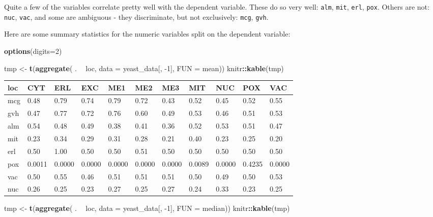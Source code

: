 \documentclass[]{book}
\newenvironment{Shaded}{\begin{snugshade}}{\end{snugshade}}
\newcommand{\DataTypeTok}[1]{\textcolor[rgb]{0.13,0.29,0.53}{#1}}
\newcommand{\DecValTok}[1]{\textcolor[rgb]{0.00,0.00,0.81}{#1}}
\newcommand{\KeywordTok}[1]{\textcolor[rgb]{0.13,0.29,0.53}{\textbf{#1}}}
\newcommand{\NormalTok}[1]{#1}
\newcommand{\OperatorTok}[1]{\textcolor[rgb]{0.81,0.36,0.00}{\textbf{#1}}}
\newcommand{\StringTok}[1]{\textcolor[rgb]{0.31,0.60,0.02}{#1}}
\begin{document}
Quite a few of the variables correlate pretty well with the dependent variable. These do so very well: \texttt{alm}, \texttt{mit}, \texttt{erl}, \texttt{pox}. Others are not: \texttt{nuc}, \texttt{vac}, and some are ambiguous - they discriminate, but not exclusively: \texttt{mcg}, \texttt{gvh}.

Here are some summary statistics for the numeric variables split on the dependent variable:

\begin{Shaded}
\begin{Highlighting}[]
\KeywordTok{options}\NormalTok{(}\DataTypeTok{digits=}\DecValTok{2}\NormalTok{)}

\NormalTok{tmp <-}\StringTok{ }\KeywordTok{t}\NormalTok{(}\KeywordTok{aggregate}\NormalTok{( . }\OperatorTok{~}\StringTok{ }\NormalTok{loc, }\DataTypeTok{data =}\NormalTok{ yeast_data[, }\DecValTok{-1}\NormalTok{], }\DataTypeTok{FUN =}\NormalTok{ mean))}
\NormalTok{knitr}\OperatorTok{::}\KeywordTok{kable}\NormalTok{(tmp)}
\end{Highlighting}
\end{Shaded}

\begin{tabular}{l|l|l|l|l|l|l|l|l|l|l}
\hline
loc & CYT & ERL & EXC & ME1 & ME2 & ME3 & MIT & NUC & POX & VAC\\
\hline
mcg & 0.48 & 0.79 & 0.74 & 0.79 & 0.72 & 0.43 & 0.52 & 0.45 & 0.52 & 0.55\\
\hline
gvh & 0.47 & 0.77 & 0.72 & 0.76 & 0.60 & 0.49 & 0.53 & 0.46 & 0.51 & 0.53\\
\hline
alm & 0.54 & 0.48 & 0.49 & 0.38 & 0.41 & 0.36 & 0.52 & 0.53 & 0.51 & 0.47\\
\hline
mit & 0.23 & 0.34 & 0.29 & 0.31 & 0.28 & 0.21 & 0.40 & 0.23 & 0.25 & 0.20\\
\hline
erl & 0.50 & 1.00 & 0.50 & 0.50 & 0.51 & 0.50 & 0.50 & 0.50 & 0.50 & 0.50\\
\hline
pox & 0.0011 & 0.0000 & 0.0000 & 0.0000 & 0.0000 & 0.0000 & 0.0089 & 0.0000 & 0.4235 & 0.0000\\
\hline
vac & 0.50 & 0.55 & 0.46 & 0.51 & 0.51 & 0.51 & 0.50 & 0.49 & 0.50 & 0.53\\
\hline
nuc & 0.26 & 0.25 & 0.23 & 0.27 & 0.25 & 0.27 & 0.24 & 0.33 & 0.23 & 0.25\\
\hline
\end{tabular}

\begin{Shaded}
\begin{Highlighting}[]
\NormalTok{tmp <-}\StringTok{ }\KeywordTok{t}\NormalTok{(}\KeywordTok{aggregate}\NormalTok{( . }\OperatorTok{~}\StringTok{ }\NormalTok{loc, }\DataTypeTok{data =}\NormalTok{ yeast_data[, }\DecValTok{-1}\NormalTok{], }\DataTypeTok{FUN =}\NormalTok{ median))}
\NormalTok{knitr}\OperatorTok{::}\KeywordTok{kable}\NormalTok{(tmp)}
\end{Highlighting}
\end{Shaded}
\end{document}
